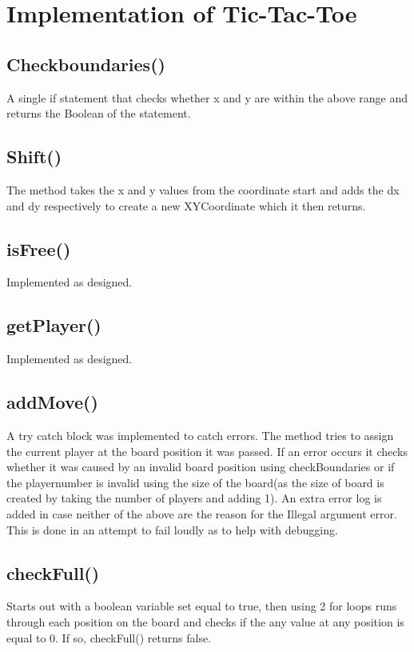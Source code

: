 \documentclass[a4paper,10pt]{article}
\begin{document}
	\section{Implementation  of Tic-Tac-Toe}  
	\subsection{Checkboundaries()}
	A single if statement that checks whether x and y are within the above range and returns the Boolean of the statement.
	\subsection{Shift()}
	The method takes the x and y values from the coordinate start and adds the dx and dy respectively to create a new XYCoordinate which it then returns.
	\subsection{isFree()}
	Implemented as designed.
	\subsection{getPlayer()}
	Implemented as designed.
	\subsection{addMove()}
	A try catch block was implemented to catch errors. The method tries to assign the current player at the board position it was passed. If an error occurs it checks whether it was caused by an invalid board position using checkBoundaries or if the playernumber is invalid using the size of the board(as the size of board is created by taking the number of players and adding 1). An extra error log is added in case neither of the above are the reason for the Illegal argument error. This is done in an attempt to fail loudly as to help with debugging.
	\subsection{checkFull()}
	Starts out with a boolean variable set equal to true, then using 2 for loops runs through each position on the board and checks if the any value at any position is equal to 0. If so, checkFull() returns false.
	
\end{document}
